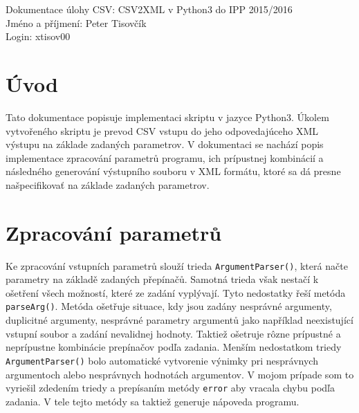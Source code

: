 \documentclass[10pt,a4paper,final]{article}
\begin{document}

  \pagestyle{plain}
  \setcounter{page}{1}
  
  \setlength{\parindent}{1cm}
  \setlength{\parskip}{0.5cm plus4mm minus3mm}
  
  \noindent
  Dokumentace úlohy CSV: CSV2XML v Python3 do IPP 2015/2016 \\
  Jméno a příjmení: Peter Tisovčík \\
  Login: xtisov00 \\
  


  \section{Úvod} \label{uvod}

Tato dokumentace popisuje implementaci skriptu v jazyce Python3. Úkolem vytvořeného skriptu je prevod CSV vstupu do jeho odpovedajúceho XML výstupu na základe zadaných parametrov. V dokumentaci se nachází popis implementace zpracování parametrů programu, ich prípustnej kombinácií a následného generování výstupního souboru v XML formátu, ktoré sa dá presne našpecifikovať na základe zadaných parametrov.

  \section{Zpracování parametrů} \label{zpracovani-parametru}

Ke zpracování vstupních parametrů slouží trieda \texttt{ArgumentParser()}, která načte parametry na základě zadaných přepínačů. Samotná trieda však nestačí k ošetření všech možností, které ze zadání vyplývají. Tyto nedostatky řeší metóda \texttt{parseArg()}. Metóda ošetřuje situace, kdy jsou zadány nesprávné argumenty, duplicitné argumenty, nesprávné parametry argumentů jako například neexistující vstupní soubor a zadání nevalidnej hodnoty. Taktiež ošetruje rôzne prípustné a neprípustne kombinácie prepínačov podľa zadania. Menším nedostatkom triedy \texttt{ArgumentParser()} bolo automatické vytvorenie výnimky pri nesprávnych argumentoch alebo nesprávnych hodnotách argumentov. V mojom prípade som to vyriešil zdedením triedy a prepísaním metódy \texttt{error} aby vracala chybu podľa zadania. V tele tejto metódy sa taktiež generuje nápoveda programu.
	
\end{document}

